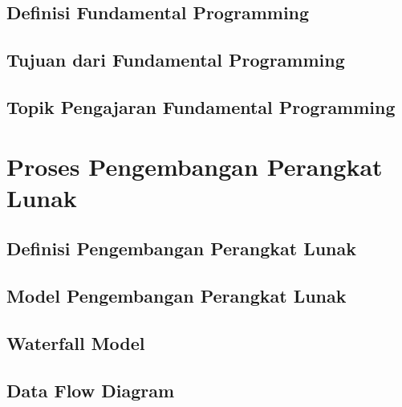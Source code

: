 	\subsection{Definisi Fundamental Programming}
	\subsection{Tujuan dari Fundamental Programming}
	\subsection{Topik Pengajaran Fundamental Programming}
	
\section{Proses Pengembangan Perangkat Lunak}
	\subsection{Definisi Pengembangan Perangkat Lunak}
	\subsection{Model Pengembangan Perangkat Lunak}
	\subsection{Waterfall Model}
	\subsection{Data Flow Diagram}
